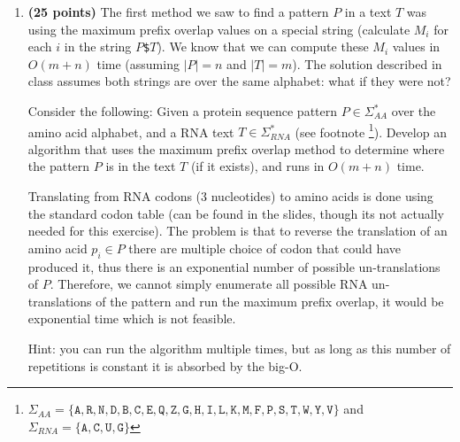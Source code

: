 \documentclass[11pt, oneside]{article}   	%
\begin{document}
\begin{enumerate}
\item \textbf{(25 points)} 
The first method we saw to find a pattern $P$ in a text $T$ was using the maximum prefix overlap values on a special string (calculate $M_i$ for each $i$ in the string $P$\texttt{\$}$T$).
We know that we can compute these $M_i$ values in $O(m+n)$ time (assuming $|P|=n$ and $|T|=m$).
The solution described in class assumes both strings are over the same alphabet: what if they were not?

Consider the following:
Given a protein sequence pattern $P\in\Sigma_{AA}^*$ over the amino acid alphabet, and a RNA text $T\in\Sigma_{RNA}^*$ 
(see footnote 
\footnote{$\Sigma_{AA} = \{\texttt{A},\texttt{R},\texttt{N},\texttt{D},\texttt{B},\texttt{C},\texttt{E},\texttt{Q},\texttt{Z},\texttt{G},\texttt{H},\texttt{I},\texttt{L},\texttt{K},\texttt{M},\texttt{F},\texttt{P},\texttt{S},\texttt{T},\texttt{W},\texttt{Y},\texttt{V}\}$ and $\Sigma_{RNA} = \{\texttt{A},\texttt{C},\texttt{U},\texttt{G}\}$}). 
Develop an algorithm that uses the maximum prefix overlap method to determine where the pattern $P$ is in the text $T$ (if it exists),
and runs in $O(m+n)$ time. 

Translating from RNA codons (3 nucleotides) to amino acids is done using the standard codon table (can be found in the slides, though its not actually needed for this exercise). 
The problem is that to reverse the translation of an amino acid $p_i \in P$ there are multiple choice of codon that could have produced it, 
thus there is an exponential number of possible un-translations of $P$.
Therefore, we cannot simply enumerate all possible RNA un-translations of the pattern and run the maximum prefix overlap, it would be exponential time which is not feasible.

Hint: you can run the algorithm multiple times, but as long as this number of repetitions is constant it is absorbed by the big-O.



\end{enumerate}
\end{document}
